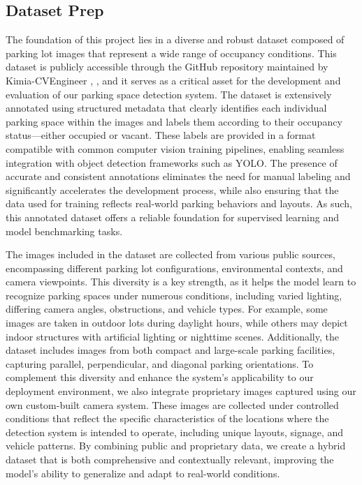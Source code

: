 \documentclass[conference]{IEEEtran}
\begin{document}
\subsection{Dataset Prep}

The foundation of this project lies in a diverse and robust dataset composed of parking lot images that represent a wide range of occupancy conditions. 
This dataset is publicly accessible through the GitHub repository maintained by Kimia-CVEngineer \cite{dataset_images}, \cite{images_original}, 
and it serves as a critical asset for the development and evaluation of our parking space detection system. 
The dataset is extensively annotated using structured metadata that clearly identifies each individual parking space within the images and labels them according to their occupancy status—either occupied or vacant. 
These labels are provided in a format compatible with common computer vision training pipelines, 
enabling seamless integration with object detection frameworks such as YOLO. 
The presence of accurate and consistent annotations eliminates the need for manual labeling and significantly accelerates the development process, 
while also ensuring that the data used for training reflects real-world parking behaviors and layouts. 
As such, 
this annotated dataset offers a reliable foundation for supervised learning and model benchmarking tasks.

The images included in the dataset are collected from various public sources, 
encompassing different parking lot configurations, 
environmental contexts, 
and camera viewpoints. 
This diversity is a key strength, 
as it helps the model learn to recognize parking spaces under numerous conditions, 
including varied lighting, 
differing camera angles, 
obstructions, 
and vehicle types. 
For example, 
some images are taken in outdoor lots during daylight hours,
while others may depict indoor structures with artificial lighting or nighttime scenes. 
Additionally, 
the dataset includes images from both compact and large-scale parking facilities, 
capturing parallel, 
perpendicular, 
and diagonal parking orientations. 
To complement this diversity and enhance the system’s applicability to our deployment environment, 
we also integrate proprietary images captured using our own custom-built camera system. 
These images are collected under controlled conditions that reflect the specific characteristics of the locations where the detection system is intended to operate, 
including unique layouts, signage, 
and vehicle patterns. 
By combining public and proprietary data, 
we create a hybrid dataset that is both comprehensive and contextually relevant, 
improving the model’s ability to generalize and adapt to real-world conditions.
\end{document}

